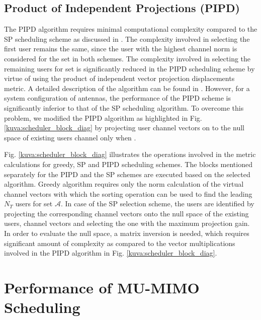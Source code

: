 \documentclass[conference,letterpaper,10pt]{./../../IEEE/IEEEtran}
\begin{document}
\subsection{Product of Independent Projections (PIPD)}
The PIPD algorithm requires minimal computational complexity compared to the SP scheduling scheme as discussed in \cite{venkatraman2014low}. The complexity involved in selecting the first user remains the same, since the user with the highest channel norm is considered for the set  in both schemes. The complexity involved in selecting the remaining users for set  is significantly reduced in the PIPD scheduling scheme by virtue of using the product of independent vector projection displacements metric. A detailed description of the algorithm can be found in \cite{venkatraman2014low}. However, for a system configuration of  antennas, the performance of the PIPD scheme is significantly inferior to that of the SP scheduling algorithm. To overcome this problem, we modified the PIPD algorithm as highlighted in Fig. \ref{kuva:scheduler_block_diag} by projecting user channel vectors on to the null space of existing users channel only when . 

Fig. \ref{kuva:scheduler_block_diag} illustrates the operations involved in the metric calculations for greedy, SP and PIPD scheduling schemes. The blocks mentioned separately for the PIPD and the SP schemes are executed based on the selected algorithm. Greedy algorithm requires only the norm calculation of the virtual channel vectors with which the sorting operation can be used to find the leading $N_T$ users for set $\mathcal{A}$. In case of the SP selection scheme, the users are identified by projecting the corresponding channel vectors onto the null space of the existing users, channel vectors and selecting the one with the maximum projection gain. In order to evaluate the null space, a matrix inversion is needed, which requires significant amount of complexity as compared to the vector multiplications involved in the PIPD algorithm in Fig. \ref{kuva:scheduler_block_diag}.

\section{Performance of MU-MIMO Scheduling}
\label{sec:perf_scheduling}
\end{document}
